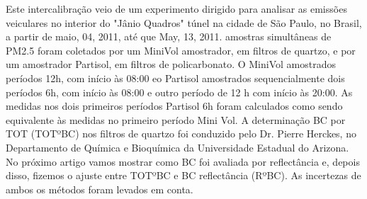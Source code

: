 Este intercalibração veio de um experimento dirigido para analisar as emissões veiculares no interior do "Jânio Quadros" túnel na cidade de São Paulo, no Brasil, a partir de maio, 04, 2011, até que May, 13, 2011. amostras simultâneas de PM2.5 foram coletados por um MiniVol amostrador, em filtros de quartzo, e por um amostrador Partisol, em filtros de policarbonato. O MiniVol amostrados períodos 12h, com início às 08:00 eo Partisol amostrados sequencialmente dois períodos 6h, com início às 08:00 e outro período de 12 h com início às 20:00. As medidas nos dois primeiros períodos Partisol 6h foram calculados como sendo equivalente às medidas no primeiro período Mini Vol.
A determinação BC por TOT (TOTºBC) nos filtros de quartzo foi conduzido pelo Dr. Pierre Herckes, no Departamento de Química e Bioquímica da Universidade Estadual do Arizona. No próximo artigo vamos mostrar como BC foi avaliada por reflectância e, depois disso, fizemos o ajuste entre TOTºBC e BC reflectância (RºBC). As incertezas de ambos os métodos foram levados em conta.







